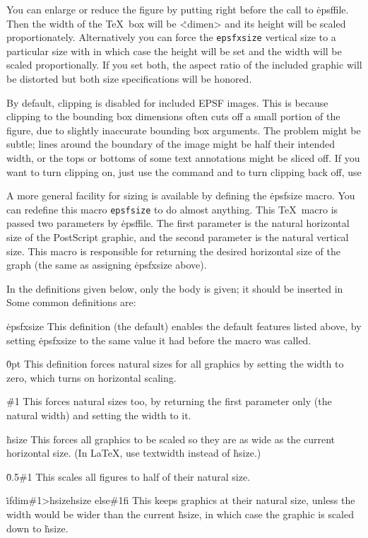 You can enlarge or reduce the figure by putting
\noindent
right before the call to \.{\ttbackslash epsffile}.
Then the width of the \TeX\ box will be \.{<dimen>} and its
height will be scaled proportionately.  Alternatively you can force the
\^{{\tt epsfxsize}}
vertical size to a particular size with
\noindent
in which case the height will be set and the width will be scaled
proportionally.  If you set both, the aspect ratio of the included
graphic will be distorted but both size specifications will be
honored.

By default, clipping is disabled for included EPSF images.  This is
because clipping to the bounding box dimensions often cuts off a
small portion of the figure, due to slightly inaccurate bounding
box arguments.  The problem might be subtle; lines around the boundary
of the image might be half their intended width, or the tops or
bottoms of some text annotations might be sliced off.  If you want to
turn clipping on, just use the command
\noindent
and to turn clipping back off, use

A more general facility for sizing is available by defining the
\.{\ttbackslash epsfsize} macro.   You can redefine this macro
\^{{\tt epsfsize}}
to do almost anything.  This \TeX\ macro is passed two parameters
by \.{\ttbackslash epsffile}.  The first parameter is the natural
horizontal size of
the PostScript graphic, and the second parameter is the natural vertical
size.  This macro is responsible for returning the desired horizontal size of
the graph (the same as assigning \.{\ttbackslash epsfxsize} above).

In the definitions given below, only the body is given; it should be inserted
in
\noindent
Some common definitions are:

{\options
\.{\ttbackslash epsfxsize}
This definition (the default) enables the default features listed above,
by setting \.{\ttbackslash epsfxsize} to the same value it had before
the macro was called.

\.{0pt}
This definition forces natural sizes for all graphics by setting the width to
zero, which turns on horizontal scaling.

\.{\#1}
This forces natural sizes too, by returning the first parameter only
(the natural width) and setting the width to it.

\.{\ttbackslash hsize}
This forces all graphics to be scaled so they are as wide as the current
horizontal size.  (In La\TeX, use \.{\ttbackslash textwidth} instead
of \.{\ttbackslash hsize}.)

\.{0.5\#1}
This scales all figures to half of their natural size.

\.{\ttbackslash ifdim\#1>\ttbackslash hsize\ttbackslash hsize\ttbackslash
else\#1\ttbackslash fi}
This keeps graphics at their natural size, unless the width would be wider
than the current \.{\ttbackslash hsize}, in which case the graphic is
scaled down to \.{\ttbackslash hsize}.\par}

